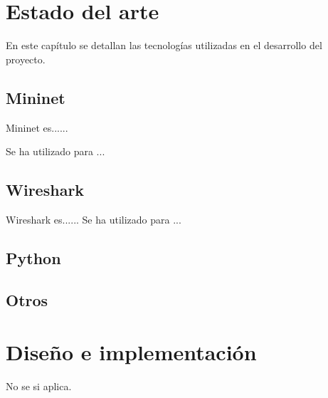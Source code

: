 \documentclass[a4paper, 12pt]{book}
\begin{document}
	
	
	\cleardoublepage
	\chapter{Estado del arte}
	\label{chap:estado}
	
	En este capítulo se detallan las tecnologías utilizadas en el desarrollo del proyecto.	
	
	\section{Mininet} 
	\label{sec:seccion1}
	
	Mininet es......
	
	Se ha utilizado para ...
	
	\section{Wireshark} 
	\label{sec:seccion2}
	
	Wireshark es......	
	Se ha utilizado para ...	
	
	\section{Python} 
	\label{sec:seccion3}
	
	\section{Otros} 
	\label{sec:seccion4}
	
	
	\cleardoublepage
	\chapter{Diseño e implementación}
	\label{sec:diseno}
	 
	 No se si aplica.
	
	
	
\end{document}
